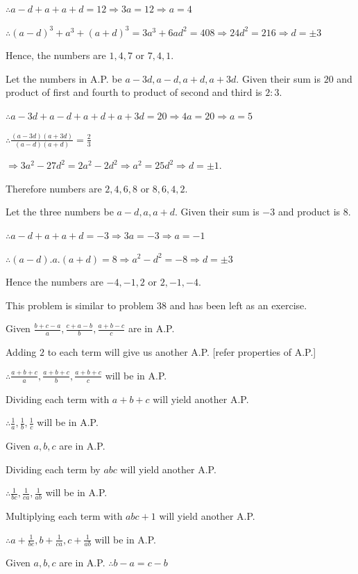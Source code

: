   $\therefore a - d + a + a + d = 12 \Rightarrow 3a = 12 \Rightarrow a = 4$

  $\therefore (a - d)^3 + a^3 + (a + d)^3 = 3a^3 + 6ad^2 = 408 \Rightarrow 24d^2 = 216 \Rightarrow d = \pm 3$

  Hence, the numbers are $1, 4, 7$ or $7, 4, 1$.
\item Let the numbers in A.P. be $a - 3d, a - d, a + d, a + 3d$. Given their sum is $20$ and product of first and
  fourth to product of second and third is $2:3$.

  $\therefore a - 3d + a - d + a + d + a + 3d = 20 \Rightarrow 4a = 20 \Rightarrow a = 5$

  $\therefore \frac{(a - 3d)(a + 3d)}{(a - d)(a + d)} = \frac{2}{3}$

  $\Rightarrow 3a^2 - 27d^2 = 2a^2 - 2d^2 \Rightarrow a^2 = 25d^2 \Rightarrow d = \pm1$.

  Therefore numbers are $2, 4, 6, 8$ or $8, 6, 4, 2$.
\item Let the three numbers be $a - d, a, a + d$. Given their sum is $-3$ and product is $8$.

  $\therefore a - d + a + a + d = -3 \Rightarrow 3a = -3 \Rightarrow a = -1$

  $\therefore (a - d).a.(a + d) = 8 \Rightarrow a^2 - d^2 = -8 \Rightarrow d = \pm3$

  Hence the numbers are $-4, -1, 2$ or $2, -1, -4$.
\item This problem is similar to problem 38 and has been left as an exercise.
\item Given $\frac{b + c - a}{a}, \frac{c + a - b}{b}, \frac{a + b - c}{c}$ are in A.P.

  Adding $2$ to each term will give us another A.P. [refer properties of A.P.]

  $\therefore \frac{a + b + c}{a}, \frac{a + b + c}{b}, \frac{a + b + c}{c}$ will be in A.P.

  Dividing each term with $a + b + c$ will yield another A.P.

  $\therefore \frac{1}{a}, \frac{1}{b}, \frac{1}{c}$ will be in A.P.
\item Given $a, b, c$ are in A.P.

  Dividing each term by $abc$ will yield another A.P.

  $\therefore \frac{1}{bc}, \frac{1}{ca}, \frac{1}{ab}$ will be in A.P.

  Multiplying each term with $abc + 1$ will yield another A.P.

  $\therefore a + \frac{1}{bc}, b + \frac{1}{ca}, c + \frac{1}{ab}$ will be in A.P.
\item Given $a, b, c$ are in A.P. $\therefore b - a = c - b$

